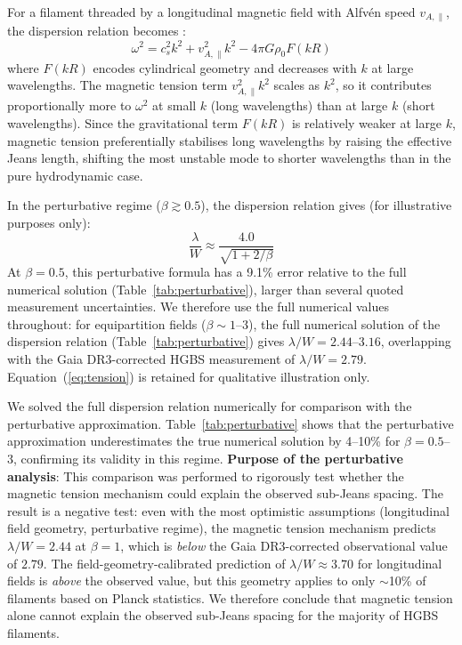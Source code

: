\documentclass[twoside,twocolumn]{mnras}
\begin{document}
For a filament threaded by a longitudinal magnetic field with Alfv\'en speed $v_{A,\parallel}$, the dispersion relation becomes \citep{Nakamura1993}:
\begin{equation}
\omega^2 = c_s^2 k^2 + v_{A,\parallel}^2 k^2 - 4\pi G\rho_0 F(kR)
\label{eq:dispersion}
\end{equation}
where $F(kR)$ encodes cylindrical geometry and decreases with $k$ at large wavelengths. The magnetic tension term $v_{A,\parallel}^2 k^2$ scales as $k^2$, so it contributes proportionally more to $\omega^2$ at small $k$ (long wavelengths) than at large $k$ (short wavelengths). Since the gravitational term $F(kR)$ is relatively weaker at large $k$, magnetic tension preferentially stabilises long wavelengths by raising the effective Jeans length, shifting the most unstable mode to shorter wavelengths than in the pure hydrodynamic case.

In the perturbative regime ($\beta \gtrsim 0.5$), the dispersion relation gives (for illustrative purposes only):
\begin{equation}
\frac{\lambda}{W} \approx \frac{4.0}{\sqrt{1 + 2/\beta}}
\label{eq:tension}
\end{equation}
At $\beta = 0.5$, this perturbative formula has a 9.1\% error relative to the full numerical solution (Table~\ref{tab:perturbative}), larger than several quoted measurement uncertainties. We therefore use the full numerical values throughout: for equipartition fields ($\beta \sim 1$--$3$), the full numerical solution of the dispersion relation (Table~\ref{tab:perturbative}) gives $\lambda/W = 2.44$--$3.16$, overlapping with the Gaia DR3-corrected HGBS measurement of $\lambda/W = 2.79$. Equation~(\ref{eq:tension}) is retained for qualitative illustration only.

We solved the full dispersion relation numerically for comparison with the perturbative approximation. Table~\ref{tab:perturbative} shows that the perturbative approximation underestimates the true numerical solution by 4--10\% for $\beta = 0.5$--$3$, confirming its validity in this regime. \textbf{Purpose of the perturbative analysis}: This comparison was performed to rigorously test whether the magnetic tension mechanism could explain the observed sub-Jeans spacing. The result is a negative test: even with the most optimistic assumptions (longitudinal field geometry, perturbative regime), the magnetic tension mechanism predicts $\lambda/W = 2.44$ at $\beta = 1$, which is {\it below} the Gaia DR3-corrected observational value of $2.79$. The field-geometry-calibrated prediction of $\lambda/W \approx 3.70$ for longitudinal fields is {\it above} the observed value, but this geometry applies to only $\sim$10\% of filaments based on Planck statistics. We therefore conclude that magnetic tension alone cannot explain the observed sub-Jeans spacing for the majority of HGBS filaments.
\end{document}
